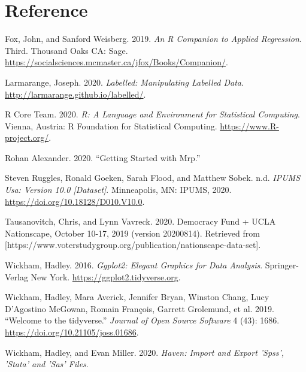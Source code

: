 \documentclass[
]{article}
\begin{document}
\hypertarget{reference}{%
\section*{Reference}\label{reference}}

\hypertarget{refs}{}
\leavevmode\hypertarget{ref-citeCar}{}%
Fox, John, and Sanford Weisberg. 2019. \emph{An R Companion to Applied
Regression}. Third. Thousand Oaks CA: Sage.
\url{https://socialsciences.mcmaster.ca/jfox/Books/Companion/}.

\leavevmode\hypertarget{ref-citelabelled}{}%
Larmarange, Joseph. 2020. \emph{Labelled: Manipulating Labelled Data}.
\url{http://larmarange.github.io/labelled/}.

\leavevmode\hypertarget{ref-citeR}{}%
R Core Team. 2020. \emph{R: A Language and Environment for Statistical
Computing}. Vienna, Austria: R Foundation for Statistical Computing.
\url{https://www.R-project.org/}.

\leavevmode\hypertarget{ref-citeCodeMRP}{}%
Rohan Alexander. 2020. ``Getting Started with Mrp.''

\leavevmode\hypertarget{ref-citeACS}{}%
Steven Ruggles, Ronald Goeken, Sarah Flood, and Matthew Sobek. n.d.
\emph{IPUMS Usa: Version 10.0 {[}Dataset{]}}. Minneapolis, MN: IPUMS,
2020. \url{https://doi.org/10.18128/D010.V10.0}.

\leavevmode\hypertarget{ref-citeDFsurvey}{}%
Tausanovitch, Chris, and Lynn Vavreck. 2020. Democracy Fund + UCLA
Nationscape, October 10-17, 2019 (version 20200814). Retrieved from
{[}https://www.voterstudygroup.org/publication/nationscape-data-set{]}.

\leavevmode\hypertarget{ref-citeggplot2}{}%
Wickham, Hadley. 2016. \emph{Ggplot2: Elegant Graphics for Data
Analysis}. Springer-Verlag New York.
\url{https://ggplot2.tidyverse.org}.

\leavevmode\hypertarget{ref-citetidyverse}{}%
Wickham, Hadley, Mara Averick, Jennifer Bryan, Winston Chang, Lucy
D'Agostino McGowan, Romain François, Garrett Grolemund, et al. 2019.
``Welcome to the tidyverse.'' \emph{Journal of Open Source Software} 4
(43): 1686. \url{https://doi.org/10.21105/joss.01686}.

\leavevmode\hypertarget{ref-citehaven}{}%
Wickham, Hadley, and Evan Miller. 2020. \emph{Haven: Import and Export
'Spss', 'Stata' and 'Sas' Files}.
\end{document}
